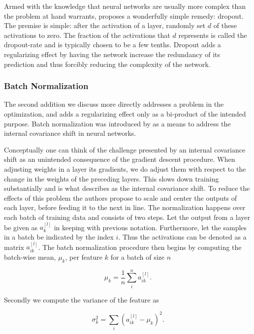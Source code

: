 Armed with the knowledge that neural networks are usually more complex than the problem at hand warrants, \citet{Srivastava2014} proposes a wonderfully simple remedy: dropout. The premise is simple: after the activation of a layer, randomly set $d$ of these activations to zero. The fraction of the activations that $d$ represents is called the dropout-rate and is typically chosen to be a few tenths. Dropout adds a regularizing effect by having the network increase the redundancy of its prediction and thus forcibly reducing the complexity of the network. 

\subsubsection{Batch Normalization}\label{sec:batchnorm}

The second addition we discuss more directly addresses a problem in the optimization, and adds a regularizing effect only as a bi-product of the intended purpose. Batch normalization was introduced by \citet{Ioffe2015} as a means to address the internal covariance shift in neural networks. 

Conceptually one can think of the challenge presented by an internal covariance shift as an unintended consequence of the gradient descent procedure. When adjusting weights in a layer its gradients, we do adjust them with respect to the change in the weights of the preceding layers. This slows down training substantially and is what \citet{Ioffe2015} describes as the internal covariance shift. To reduce the effects of this problem the authors propose to scale and center the outputs of each layer, before feeding it to the next in line. The normalization happens over each batch of training data and consists of two steps. Let the output from a layer be given as $a_k^{[l]}$ in keeping with previous notation. Furthermore, let the samples in a batch be indicated by the index $i$. Thus the activations can be denoted as a matrix $a_{ik}^{[l]}$. The batch normalization procedure then begins by computing the batch-wise mean, $\mu_k$, per feature $k$ for a batch of size $n$ 

\begin{equation}
\mu_k = \frac{1}{n} \sum_i^n a_{ik}^{[l]}.
\end{equation}

\noindent Secondly we compute the variance of the feature as 

\begin{equation}
\sigma_k^2= \sum_i (a^{[l]}_{ik} - \mu_k)^2.
\end{equation}

